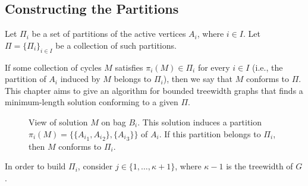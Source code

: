 \subsection{Constructing the Partitions}

Let \(\Pi_i\) be a set of partitions of the active vertices \(A_i\), where $i \in I$.
Let \(\Pi = \{\Pi_i\}_{i \in I}\) be a collection of such partitions.

If some collection of cycles \(M\) satisfies \(\pi_i(M) \in \Pi_i\) for every \(i \in I\) (i.e., the partition of \(A_i\) induced by \(M\) belongs to \(\Pi_i\)), then we say that \(M\) conforms to \(\Pi\). This chapter aims to give an algorithm for bounded treewidth graphs that finds a minimum-length solution conforming to a given \(\Pi\).

\begin{figure}[H]
    \centering
{}
    \caption{View of solution \(M\) on bag \(B_i\). This solution induces a partition \(\pi_i(M) = \{\{{A_i}_1, {A_i}_2\}, \{{A_i}_3\}\}\) of \(A_i\). If this partition belongs to \(\Pi_i\), then \(M\) conforms to \(\Pi_i\).}
    \label{fig:example_Ai_partition}
\end{figure}

In order to build \(\Pi_i\), consider \(j \in \{1, \dots, \kappa + 1\}\), where \(\kappa - 1\) is the treewidth of \(G\). 


